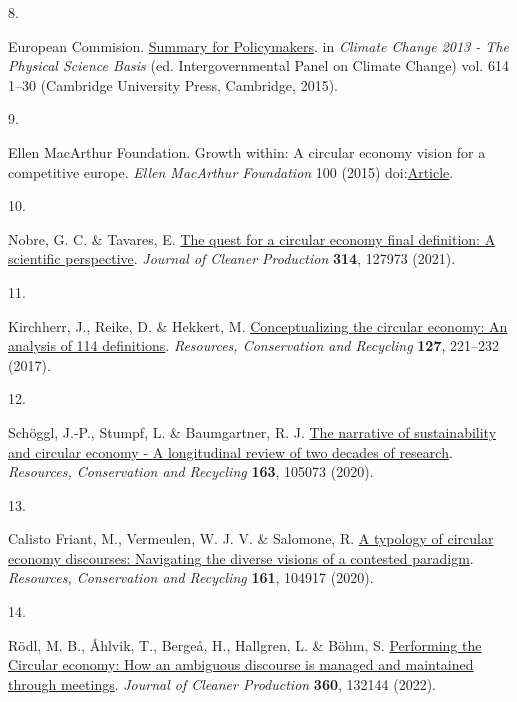 \documentclass[
  11pt,
  a4paperpaper,
  onecolumn]{article}
\newlength{\cslhangindent}
\newlength{\csllabelwidth}
\newenvironment{CSLReferences}[2] %
 {\begin{list}{}{%
  \setlength{\itemindent}{0pt}
  \setlength{\leftmargin}{0pt}
  \setlength{\parsep}{0pt}
  \ifodd #1
   \setlength{\leftmargin}{\cslhangindent}
   \setlength{\itemindent}{-1\cslhangindent}
  \fi
  \setlength{\itemsep}{#2\baselineskip}}}
 {\end{list}}
\newcommand{\CSLLeftMargin}[1]{\parbox[t]{\csllabelwidth}{\strut#1\strut}}
\newcommand{\CSLRightInline}[1]{\parbox[t]{\linewidth - \csllabelwidth}{\strut#1\strut}}
\begin{document}
\begin{CSLReferences}{0}{0}
\CSLLeftMargin{8. }%
\CSLRightInline{European Commision.
\href{https://doi.org/10.1017/CBO9781107415324.004}{Summary for
{Policymakers}}. in \emph{Climate {Change} 2013 - {The Physical Science
Basis}} (ed. Intergovernmental Panel on Climate Change) vol. 614 1--30
({Cambridge University Press}, {Cambridge}, 2015).}

\CSLLeftMargin{9. }%
\CSLRightInline{Ellen MacArthur Foundation. Growth within: A circular
economy vision for a competitive europe. \emph{Ellen MacArthur
Foundation} 100 (2015) doi:\href{https://doi.org/Article}{Article}.}

\CSLLeftMargin{10. }%
\CSLRightInline{Nobre, G. C. \& Tavares, E.
\href{https://doi.org/10.1016/j.jclepro.2021.127973}{The quest for a
circular economy final definition: {A} scientific perspective}.
\emph{Journal of Cleaner Production} \textbf{314}, 127973 (2021).}

\CSLLeftMargin{11. }%
\CSLRightInline{Kirchherr, J., Reike, D. \& Hekkert, M.
\href{https://doi.org/10.1016/j.resconrec.2017.09.005}{Conceptualizing
the circular economy: {An} analysis of 114 definitions}.
\emph{Resources, Conservation and Recycling} \textbf{127}, 221--232
(2017).}

\CSLLeftMargin{12. }%
\CSLRightInline{Schöggl, J.-P., Stumpf, L. \& Baumgartner, R. J.
\href{https://doi.org/10.1016/j.resconrec.2020.105073}{The narrative of
sustainability and circular economy - {A} longitudinal review of two
decades of research}. \emph{Resources, Conservation and Recycling}
\textbf{163}, 105073 (2020).}

\CSLLeftMargin{13. }%
\CSLRightInline{Calisto Friant, M., Vermeulen, W. J. V. \& Salomone, R.
\href{https://doi.org/10.1016/j.resconrec.2020.104917}{A typology of
circular economy discourses: {Navigating} the diverse visions of a
contested paradigm}. \emph{Resources, Conservation and Recycling}
\textbf{161}, 104917 (2020).}

\CSLLeftMargin{14. }%
\CSLRightInline{Rödl, M. B., Åhlvik, T., Bergeå, H., Hallgren, L. \&
Böhm, S. \href{https://doi.org/10.1016/J.JCLEPRO.2022.132144}{Performing
the {Circular} economy: {How} an ambiguous discourse is managed and
maintained through meetings}. \emph{Journal of Cleaner Production}
\textbf{360}, 132144 (2022).}


\end{CSLReferences}
\end{document}
